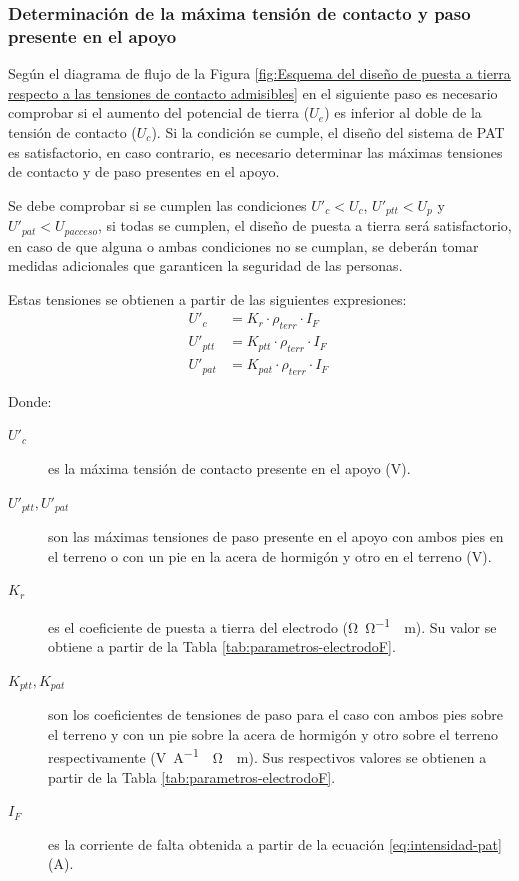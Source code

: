 \subsubsection{Determinación de la máxima tensión de contacto y paso presente en el apoyo}
\label{subsubsec:apoyosF-tensionesMaximas-pat}
Según el diagrama de flujo de la Figura \ref{fig:Esquema del diseño de puesta a tierra respecto a las tensiones de contacto admisibles} en el siguiente paso es necesario comprobar si el aumento del potencial de tierra ($U_e$) es inferior al doble de la tensión de contacto ($U_c$). Si la condición se cumple, el diseño del sistema de \ac{PAT} es satisfactorio, en caso contrario, es necesario determinar las máximas tensiones de contacto y de paso presentes en el apoyo.

Se debe comprobar si se cumplen las condiciones $U'_c<U_c$, $U'_{ptt}<U_p$ y $U'_{pat}<U_{pacceso}$, si todas se cumplen, el diseño de puesta a tierra será satisfactorio, en caso de que alguna o ambas condiciones no se cumplan, se deberán tomar medidas adicionales que garanticen la seguridad de las personas.

Estas tensiones se obtienen a partir de las siguientes expresiones:
\begin{align}
    U'_c &= K_r\cdot\rho_{terr}\cdot I_F
    \label{eq:pat-U'c}\\[0.5em]
    U'_{ptt} &= K_{ptt}\cdot\rho_{terr}\cdot I_F
    \label{eq:pat-U'ptt}\\[0.5em]
    U'_{pat} &= K_{pat}\cdot\rho_{terr}\cdot I_F
    \label{eq:pat-U'pat}\
\end{align}

Donde:
\begin{description}
    \item[$U'_c$] es la máxima tensión de contacto presente en el apoyo (\si{\volt}).
    \item[$U'_{ptt},U'_{pat}$] son las máximas tensiones de paso presente en el apoyo con ambos pies en el terreno o con un pie en la acera de hormigón y otro en el terreno (\si{\volt}).
    \item[$K_r$] es el coeficiente de puesta a tierra del electrodo (\si{\ohm\per\ohm\cdot\meter}). Su valor se obtiene a partir de la Tabla \ref{tab:parametros-electrodoF}.
    \item[$K_{ptt},K_{pat}$] son los coeficientes de tensiones de paso para el caso con ambos pies sobre el terreno y con un pie sobre la acera de hormigón y otro sobre el terreno respectivamente (\si{\volt\per\ampere\cdot\ohm\cdot\meter}). Sus respectivos valores se obtienen a partir de la Tabla \ref{tab:parametros-electrodoF}.
    \item[$I_F$] es la corriente de falta obtenida a partir de la ecuación \ref{eq:intensidad-pat} (\si{\ampere}).
\end{description}

